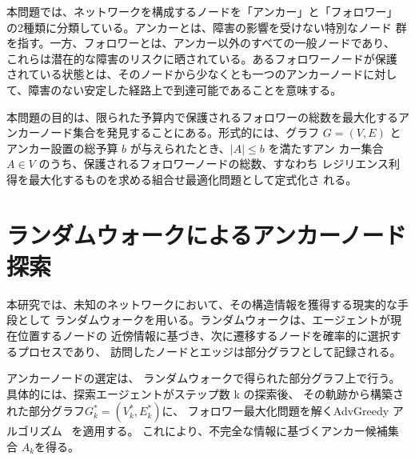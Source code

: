 \documentclass[twocolumn,a4paper, dvipdfmx]{ieicejsp}
\begin{document}
本問題では、ネットワークを構成するノードを「アンカー」と「フォロワー」
の2種類に分類している。アンカーとは、障害の影響を受けない特別なノード
群を指す。一方、フォロワーとは、アンカー以外のすべての一般ノードであり、
これらは潜在的な障害のリスクに晒されている。あるフォロワーノードが保護
されている状態とは、そのノードから少なくとも一つのアンカーノードに対し
て、障害のない安定した経路上で到達可能であることを意味する。

本問題の目的は、限られた予算内で保護されるフォロワーの総数を最大化するア
ンカーノード集合を発見することにある。形式的には、グラフ $G = (V, E)$
とアンカー設置の総予算 $b$ が与えられたとき、$|A| \leq b$ を満たすアン
カー集合 $A \in V$ のうち、保護されるフォロワーノードの総数、すなわち
レジリエンス利得を最大化するものを求める組合せ最適化問題として定式化さ
れる。%


\section{ランダムウォークによるアンカーノード探索}



本研究では、未知のネットワークにおいて、その構造情報を獲得する現実的な手段として
ランダムウォークを用いる。ランダムウォークは、エージェントが現在位置するノードの
近傍情報に基づき、次に遷移するノードを確率的に選択するプロセスであり、
訪問したノードとエッジは部分グラフとして記録される。

アンカーノードの選定は、
ランダムウォークで得られた部分グラフ上で行う。具体的には、探索エージェントがステップ数 k の探索後、
その軌跡から構築された部分グラフ$G^*_k = (V^*_k, E^*_k)$に、
フォロワー最大化問題を解くAdvGreedy アルゴリズム~\cite{Teng24:WWW} を適用する。
これにより、不完全な情報に基づくアンカー候補集合 $A_k$を得る。
\end{document}
